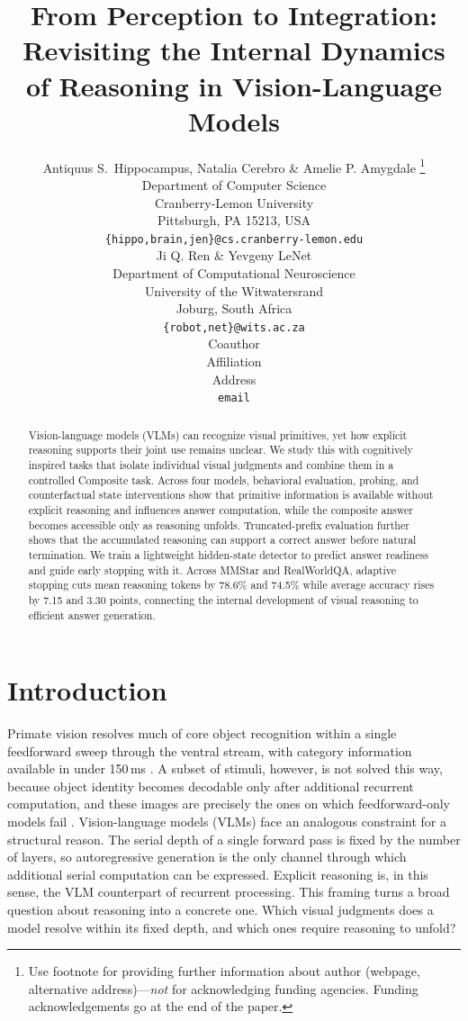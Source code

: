 \documentclass{article} %
\title{From Perception to Integration: \\ Revisiting the Internal Dynamics of Reasoning in Vision-Language Models}
\author{Antiquus S.~Hippocampus, Natalia Cerebro \& Amelie P. Amygdale \thanks{ Use footnote for providing further information
about author (webpage, alternative address)---\emph{not} for acknowledging
funding agencies.  Funding acknowledgements go at the end of the paper.} \\
Department of Computer Science\\
Cranberry-Lemon University\\
Pittsburgh, PA 15213, USA \\
\texttt{\{hippo,brain,jen\}@cs.cranberry-lemon.edu} \\
\And
Ji Q. Ren \& Yevgeny LeNet \\
Department of Computational Neuroscience \\
University of the Witwatersrand \\
Joburg, South Africa \\
\texttt{\{robot,net\}@wits.ac.za} \\
\AND
Coauthor \\
Affiliation \\
Address \\
\texttt{email}
}
\begin{document}
\raggedbottom


\maketitle

\begin{abstract}
Vision-language models (VLMs) can recognize visual primitives, yet how explicit reasoning supports their joint use remains unclear. We study this with cognitively inspired tasks that isolate individual visual judgments and combine them in a controlled Composite task. Across four models, behavioral evaluation, probing, and counterfactual state interventions show that primitive information is available without explicit reasoning and influences answer computation, while the composite answer becomes accessible only as reasoning unfolds. Truncated-prefix evaluation further shows that the accumulated reasoning can support a correct answer before natural termination. We train a lightweight hidden-state detector to predict answer readiness and guide early stopping with it. Across MMStar and RealWorldQA, adaptive stopping cuts mean reasoning tokens by 78.6\% and 74.5\% while average accuracy rises by 7.15 and 3.30 points, connecting the internal development of visual reasoning to efficient answer generation.
\end{abstract}

\section{Introduction}

Primate vision resolves much of core object recognition within a single feedforward sweep through the ventral stream, with category information available in under 150\,ms \citep{thorpe1996speed,dicarlo2012how}. A subset of stimuli, however, is not solved this way, because object identity becomes decodable only after additional recurrent computation, and these images are precisely the ones on which feedforward-only models fail \citep{lamme2000distinct,kar2019evidence}. Vision-language models (VLMs) face an analogous constraint for a structural reason. The serial depth of a single forward pass is fixed by the number of layers, so autoregressive generation is the only channel through which additional serial computation can be expressed. Explicit reasoning is, in this sense, the VLM counterpart of recurrent processing. This framing turns a broad question about reasoning into a concrete one. Which visual judgments does a model resolve within its fixed depth, and which ones require reasoning to unfold?
\end{document}
